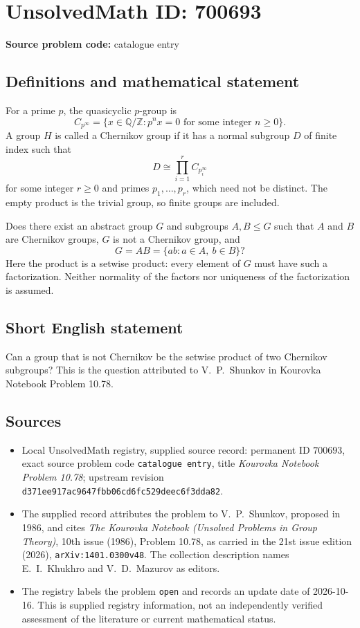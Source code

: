 \documentclass[11pt]{article}
\newcommand{\Z}{\mathbb{Z}}
\newcommand{\Q}{\mathbb{Q}}
\begin{document}
\section*{UnsolvedMath ID: 700693}
\textbf{Source problem code:} catalogue entry
\subsection{Definitions and mathematical statement}
For a prime \(p\), the quasicyclic \(p\)-group is
\[
C_{p^\infty}=\{x\in\Q/\Z : p^n x=0\text{ for some integer }n\geq 0\}.
\]
A group \(H\) is called a Chernikov group if it has a normal subgroup \(D\) of finite index such that
\[
D\cong\prod_{i=1}^{r}C_{p_i^\infty}
\]
for some integer \(r\geq 0\) and primes \(p_1,\ldots,p_r\), which need not be distinct. The empty product is the trivial group, so finite groups are included.

Does there exist an abstract group \(G\) and subgroups \(A,B\leq G\) such that \(A\) and \(B\) are Chernikov groups, \(G\) is not a Chernikov group, and
\[
G=AB=\{ab:a\in A,\ b\in B\}?
\]
Here the product is a setwise product: every element of \(G\) must have such a factorization. Neither normality of the factors nor uniqueness of the factorization is assumed.
\subsection{Short English statement}
Can a group that is not Chernikov be the setwise product of two Chernikov subgroups? This is the question attributed to V.\ P.\ Shunkov in Kourovka Notebook Problem 10.78.
\subsection{Sources}
\begin{itemize}
\item Local UnsolvedMath registry, supplied source record: permanent ID \(700693\), exact source problem code \texttt{catalogue entry}, title \emph{Kourovka Notebook Problem 10.78}; upstream revision \texttt{d371ee917ac9647fbb06cd6fc529deec6f3dda82}.
\item The supplied record attributes the problem to V.\ P.\ Shunkov, proposed in 1986, and cites \emph{The Kourovka Notebook (Unsolved Problems in Group Theory)}, 10th issue (1986), Problem 10.78, as carried in the 21st issue edition (2026), \texttt{arXiv:1401.0300v48}. The collection description names E.\ I.\ Khukhro and V.\ D.\ Mazurov as editors.
\item The registry labels the problem \texttt{open} and records an update date of 2026-10-16. This is supplied registry information, not an independently verified assessment of the literature or current mathematical status.
\end{itemize}
\end{document}
